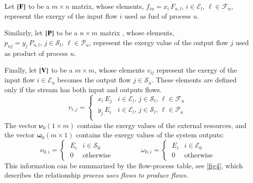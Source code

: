 \documentclass{ecos}
\begin{document}
Let  $\left[ \textbf{F} \right]$ to be a  $m \times n$ matrix, whose elements, $f_{iu}=x_i\,F_{u,l},\, i\in\mathcal{E}_l, \, \ell\in\mathcal{F}_u$, represent the exergy  of the input flow $i$ used as fuel of process $u$.

Similarly, let $\left[ \textbf{P} \right]$ to be a $n \times m$ matrix , whose elements, $p_{uj}=y_j\,P_{u,l},\, j\in\mathcal{S}_l, \, \ell\in\mathcal{P}_u$, represent the exergy value of the output flow $j$ used as product of process $u$.
 
Finally, let $\left[ \textbf{V} \right]$ to be a $m \times m$, whose elements $v_{ij}$ represent the exergy of the input flow $i\in\mathcal{E}_u$ becomes the output flow $j\in\mathcal{S}_u$. These elements are defined only if the stream has both input and outputs flows.
\begin{equation}
v_{i,j}=\begin{cases}
\;x_i\,E_j & i\in\mathcal{E}_l,\, j\in\mathcal{S}_l,\, \ell\in\mathcal{F}_u\\[1em]
\;y_j\,E_i & i\in\mathcal{E}_l,\, j\in\mathcal{S}_l,\, \ell\in\mathcal{P}_u\\
\end{cases}
\end{equation}
The vector $\bm{\nu}_0 (1 \times m)$ contains the exergy values of the external resources, and the vector $\bm{\omega}_0 (m \times 1)$ contains the exergy values of the system outputs:
\begin{equation}
\nu_{0,i}=\begin{cases}
\;E_i & i\in\mathcal{S}_0 \\
\;0   & \text{otherwise}
\end{cases}
\qquad\qquad
\omega_{0,i}=\begin{cases}
\;E_i & i\in\mathcal{E}_0 \\
\;0   & \text{otherwise}
\end{cases}
\end{equation}
This information can be summarized by the flow-process table, see \cref{fig4}, which describes the relationship \emph{process uses flows to produce flows}.
\end{document}
